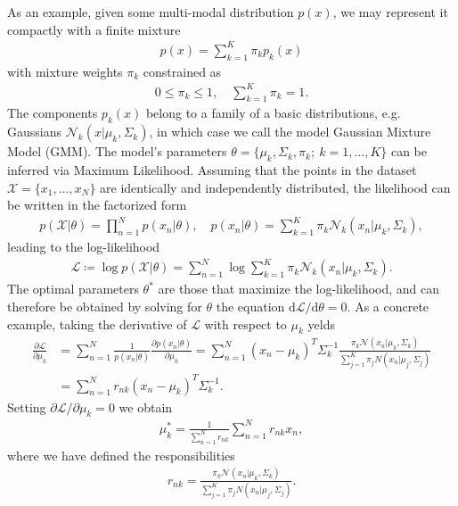 As an example, given some multi-modal distribution $p(x)$, we may represent it compactly with a finite mixture
%
\begin{align}
p(x) = \sum_{k=1}^{K} \pi_{k} p_{k}(x)
\end{align}
%
with mixture weights $\pi_{k}$ constrained as
%
\begin{align}
0 \leq \pi_k \leq 1, \quad \sum_{k=1}^{K} \pi_{k} = 1.
\end{align}
%
The components $p_{k}(x)$ belong to a family of a basic distributions, e.g. Gaussians $\mathcal{N}_k(x | \mu_k, \Sigma_k)$, in which case we call the model Gaussian Mixture Model (GMM). The model's parameters $\theta = \{ \mu_k, \Sigma_k, \pi_k; ~ k = 1, \ldots, K \}$ can be inferred via Maximum Likelihood. Assuming that the points in the dataset $\mathcal{X} = \{x_1, \ldots , x_N \}$ are identically and independently distributed, the likelihood can be written in the factorized form
%
\begin{align}
p(\mathcal{X} | \theta ) = \prod_{n=1}^N p(x_n | \theta), \quad p(x_n | \theta) = \sum_{k=1}^K \pi_k \mathcal{N}_k(x_n | \mu_k, \Sigma_k),
\end{align}
%
leading to the log-likelihood
%
\begin{align}
\mathcal{L} \coloneqq \log p(\mathcal{X} | \theta ) = \sum_{n=1}^N \log \sum_{k=1}^K \pi_k \mathcal{N}_k(x_n | \mu_k, \Sigma_k).
\end{align}
%
The optimal parameters $\theta^{*}$ are those that maximize the log-likelihood, and can therefore be obtained by solving for $\theta$ the equation $\text{d} \mathcal{L} / \text{d}\theta = 0$.
As a concrete example, taking the derivative of $\mathcal{L}$ with respect to $\mu_{k}$ yelds
%
\begin{align}
\frac{\partial \mathcal{L}}{\partial \mu_k} &= \sum_{n=1}^{N} \frac{1}{p(x_n | \theta)} \frac{\partial p(x_n | \theta) }{\partial \mu_k} = \sum_{n=1}^{N} (x_n - \mu_k)^{T} \Sigma_k^{-1} \frac{\pi_k \mathcal{N}(x_n | \mu_k, \Sigma_k)}{\sum_{j=1}^{K} \pi_j N(x_n | \mu_j, \Sigma_j) } \\
&= \sum_{n=1}^{N} r_{nk} (x_n - \mu_k)^{T} \Sigma_k^{-1} .
\end{align}
%
Setting $\partial \mathcal{L} / \partial \mu_k  = 0$ we obtain
%
\begin{align}
\mu_k^{*} = \frac{1}{ \sum_{n=1}^{N} r_{nk}} \sum_{n=1}^{N} r_{nk} x_n,
\end{align}
%
where we have defined the responsibilities
%
\begin{align}
r_{nk} = \frac{\pi_k \mathcal{N}(x_n | \mu_k, \Sigma_k)}{\sum_{j=1}^{K} \pi_j N(x_n | \mu_j, \Sigma_j) }.
\end{align}
